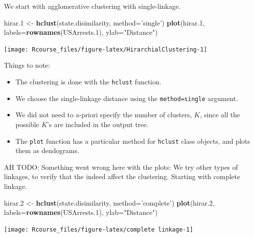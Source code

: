 \documentclass[]{book}
\newenvironment{Shaded}{\begin{snugshade}}{\end{snugshade}}
\newcommand{\KeywordTok}[1]{\textcolor[rgb]{0.13,0.29,0.53}{\textbf{#1}}}
\newcommand{\DataTypeTok}[1]{\textcolor[rgb]{0.13,0.29,0.53}{#1}}
\newcommand{\DecValTok}[1]{\textcolor[rgb]{0.00,0.00,0.81}{#1}}
\newcommand{\StringTok}[1]{\textcolor[rgb]{0.31,0.60,0.02}{#1}}
\newcommand{\NormalTok}[1]{#1}
\providecommand{\tightlist}{%
  \setlength{\itemsep}{0pt}\setlength{\parskip}{0pt}}
\theoremstyle{definition}
\theoremstyle{definition}
\theoremstyle{definition}
\theoremstyle{remark}
\begin{document}
We start with agglomerative clustering with single-linkage.

\begin{Shaded}
\begin{Highlighting}[]
\NormalTok{hirar.}\DecValTok{1}\NormalTok{ <-}\StringTok{ }\KeywordTok{hclust}\NormalTok{(state.disimilarity, }\DataTypeTok{method=}\StringTok{'single'}\NormalTok{)}
\KeywordTok{plot}\NormalTok{(hirar.}\DecValTok{1}\NormalTok{, }\DataTypeTok{labels=}\KeywordTok{rownames}\NormalTok{(USArrests.}\DecValTok{1}\NormalTok{), }\DataTypeTok{ylab=}\StringTok{"Distance"}\NormalTok{)}
\end{Highlighting}
\end{Shaded}

\texttt{[image: Rcourse\_files/figure-latex/HirarchialClustering-1]}

Things to note:

\begin{itemize}
\tightlist
\item
  The clustering is done with the \texttt{hclust} function.
\item
  We choose the single-linkage distance using the
  \texttt{method=\textquotesingle{}single\textquotesingle{}} argument.
\item
  We did not need to a-priori specify the number of clusters, \(K\),
  since all the possible \(K\)'s are included in the output tree.
\item
  The \texttt{plot} function has a particular method for \texttt{hclust}
  class objects, and plots them as dendograms.
\end{itemize}

AH TODO: Something went wrong here with the plots: We try other types of
linkages, to verify that the indeed affect the clustering. Starting with
complete linkage.

\begin{Shaded}
\begin{Highlighting}[]
\NormalTok{hirar.}\DecValTok{2}\NormalTok{ <-}\StringTok{ }\KeywordTok{hclust}\NormalTok{(state.disimilarity, }\DataTypeTok{method=}\StringTok{'complete'}\NormalTok{)}
\KeywordTok{plot}\NormalTok{(hirar.}\DecValTok{2}\NormalTok{, }\DataTypeTok{labels=}\KeywordTok{rownames}\NormalTok{(USArrests.}\DecValTok{1}\NormalTok{), }\DataTypeTok{ylab=}\StringTok{"Distance"}\NormalTok{)}
\end{Highlighting}
\end{Shaded}

\texttt{[image: Rcourse\_files/figure-latex/complete linkage-1]}
\end{document}
